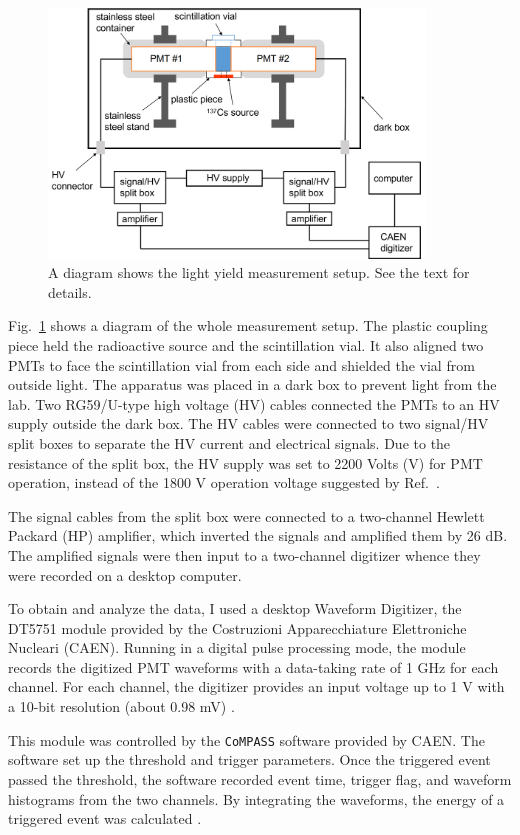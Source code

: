 \begin{figure}[htbp]
	\centering	
	\includegraphics[width=10cm]{teLSsetup.png}
	\caption[A diagram shows the light yield measurement setup.]{A diagram shows the light yield measurement setup. See the text for details.}
	\label{teLSsetup}
\end{figure}

Fig.~\ref{teLSsetup} shows a diagram of the whole measurement setup. The plastic coupling piece held the radioactive source and the scintillation vial. It also aligned two PMTs to face the scintillation vial from each side and shielded the vial from outside light. The apparatus was placed in a dark box to prevent light from the lab. Two RG59/U-type high voltage (HV) cables connected the PMTs to an HV supply outside the dark box. The HV cables were connected to two signal/HV split boxes to separate the HV current and electrical signals. Due to the resistance of the split box, the HV supply was set to 2200 Volts (V) for PMT operation, instead of the 1800 V operation voltage suggested by Ref.~\cite{pmtR580}. 

The signal cables from the split box were connected to a two-channel Hewlett Packard (HP) amplifier, which inverted the signals and amplified them by 26 dB. The amplified signals were then input to a two-channel digitizer whence they were recorded on a desktop computer.

To obtain and analyze the data, I used a desktop Waveform Digitizer, the DT5751 module provided by the Costruzioni Apparecchiature Elettroniche Nucleari (CAEN). Running in a digital pulse processing mode, the module records the digitized PMT waveforms with a data-taking rate of 1 GHz for each channel. For each channel, the digitizer provides an input voltage up to 1 V with a 10-bit resolution (about 0.98 mV) \cite{caen}.

This module was controlled by the \texttt{CoMPASS} software provided by CAEN. The software set up the threshold and trigger parameters. Once the triggered event passed the threshold, the software recorded event time, trigger flag, and waveform histograms from the two channels. By integrating the waveforms, the energy of a triggered event was calculated \cite{compass}.

